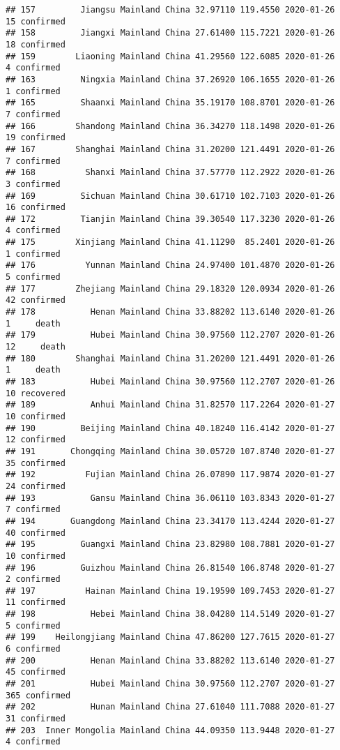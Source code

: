 \documentclass[
]{article}
\begin{document}
\begin{verbatim}
## 157         Jiangsu Mainland China 32.97110 119.4550 2020-01-26    15 confirmed
## 158         Jiangxi Mainland China 27.61400 115.7221 2020-01-26    18 confirmed
## 159        Liaoning Mainland China 41.29560 122.6085 2020-01-26     4 confirmed
## 163         Ningxia Mainland China 37.26920 106.1655 2020-01-26     1 confirmed
## 165         Shaanxi Mainland China 35.19170 108.8701 2020-01-26     7 confirmed
## 166        Shandong Mainland China 36.34270 118.1498 2020-01-26    19 confirmed
## 167        Shanghai Mainland China 31.20200 121.4491 2020-01-26     7 confirmed
## 168          Shanxi Mainland China 37.57770 112.2922 2020-01-26     3 confirmed
## 169         Sichuan Mainland China 30.61710 102.7103 2020-01-26    16 confirmed
## 172         Tianjin Mainland China 39.30540 117.3230 2020-01-26     4 confirmed
## 175        Xinjiang Mainland China 41.11290  85.2401 2020-01-26     1 confirmed
## 176          Yunnan Mainland China 24.97400 101.4870 2020-01-26     5 confirmed
## 177        Zhejiang Mainland China 29.18320 120.0934 2020-01-26    42 confirmed
## 178           Henan Mainland China 33.88202 113.6140 2020-01-26     1     death
## 179           Hubei Mainland China 30.97560 112.2707 2020-01-26    12     death
## 180        Shanghai Mainland China 31.20200 121.4491 2020-01-26     1     death
## 183           Hubei Mainland China 30.97560 112.2707 2020-01-26    10 recovered
## 189           Anhui Mainland China 31.82570 117.2264 2020-01-27    10 confirmed
## 190         Beijing Mainland China 40.18240 116.4142 2020-01-27    12 confirmed
## 191       Chongqing Mainland China 30.05720 107.8740 2020-01-27    35 confirmed
## 192          Fujian Mainland China 26.07890 117.9874 2020-01-27    24 confirmed
## 193           Gansu Mainland China 36.06110 103.8343 2020-01-27     7 confirmed
## 194       Guangdong Mainland China 23.34170 113.4244 2020-01-27    40 confirmed
## 195         Guangxi Mainland China 23.82980 108.7881 2020-01-27    10 confirmed
## 196         Guizhou Mainland China 26.81540 106.8748 2020-01-27     2 confirmed
## 197          Hainan Mainland China 19.19590 109.7453 2020-01-27    11 confirmed
## 198           Hebei Mainland China 38.04280 114.5149 2020-01-27     5 confirmed
## 199    Heilongjiang Mainland China 47.86200 127.7615 2020-01-27     6 confirmed
## 200           Henan Mainland China 33.88202 113.6140 2020-01-27    45 confirmed
## 201           Hubei Mainland China 30.97560 112.2707 2020-01-27   365 confirmed
## 202           Hunan Mainland China 27.61040 111.7088 2020-01-27    31 confirmed
## 203  Inner Mongolia Mainland China 44.09350 113.9448 2020-01-27     4 confirmed

\end{verbatim}
\end{document}
